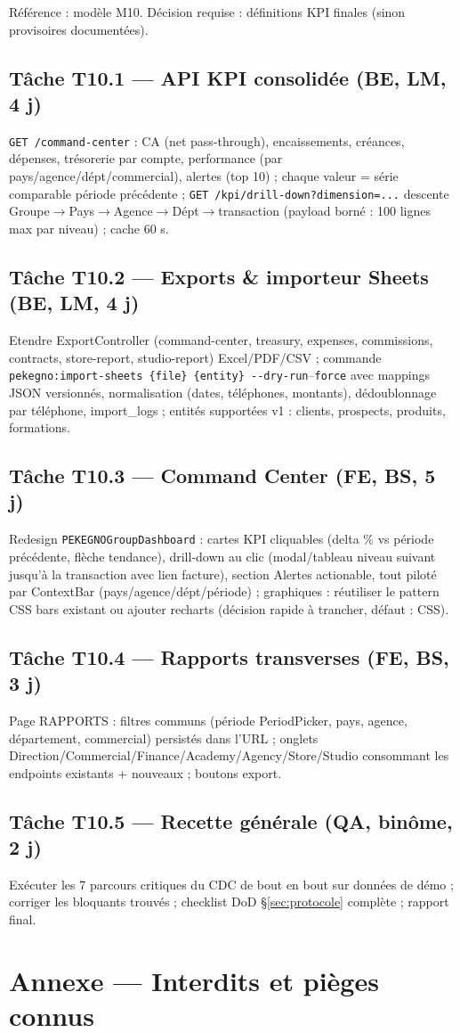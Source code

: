 \documentclass[11pt,a4paper]{article}
\newcommand{\tache}[2]{\subsection{Tâche #1 --- #2}\label{task:#1}}
\begin{document}
Référence : modèle M10. Décision requise : définitions KPI finales (sinon provisoires documentées).

\tache{T10.1}{API KPI consolidée (BE, LM, 4 j)} \verb|GET /command-center| : CA (net pass-through), encaissements, créances, dépenses, trésorerie par compte, performance (par pays/agence/dépt/commercial), alertes (top 10) ; chaque valeur = série comparable période précédente ; \verb|GET /kpi/drill-down?dimension=...| descente Groupe$\rightarrow$Pays$\rightarrow$Agence$\rightarrow$Dépt$\rightarrow$transaction (payload borné : 100 lignes max par niveau) ; cache 60 s.

\tache{T10.2}{Exports \& importeur Sheets (BE, LM, 4 j)} Etendre ExportController (command-center, treasury, expenses, commissions, contracts, store-report, studio-report) Excel/PDF/CSV ; commande \verb|pekegno:import-sheets {file} {entity} --dry-run|--\verb|force| avec mappings JSON versionnés, normalisation (dates, téléphones, montants), dédoublonnage par téléphone, import\_logs ; entités supportées v1 : clients, prospects, produits, formations.

\tache{T10.3}{Command Center (FE, BS, 5 j)} Redesign \verb|PEKEGNOGroupDashboard| : cartes KPI cliquables (delta \% vs période précédente, flèche tendance), drill-down au clic (modal/tableau niveau suivant jusqu'à la transaction avec lien facture), section Alertes actionable, tout piloté par ContextBar (pays/agence/dépt/période) ; graphiques : réutiliser le pattern CSS bars existant ou ajouter recharts (décision rapide à trancher, défaut : CSS).

\tache{T10.4}{Rapports transverses (FE, BS, 3 j)} Page RAPPORTS : filtres communs (période PeriodPicker, pays, agence, département, commercial) persistés dans l'URL ; onglets Direction/Commercial/Finance/Academy/Agency/Store/Studio consommant les endpoints existants + nouveaux ; boutons export.

\tache{T10.5}{Recette générale (QA, binôme, 2 j)} Exécuter les 7 parcours critiques du CDC de bout en bout sur données de démo ; corriger les bloquants trouvés ; checklist DoD §\ref{sec:protocole} complète ; rapport final.

\section{Annexe --- Interdits et pièges connus}
\end{document}
